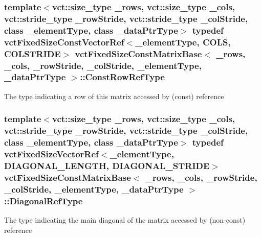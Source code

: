 \subsubsection[{Const\+Row\+Ref\+Type}]{\setlength{\rightskip}{0pt plus 5cm}template$<$vct\+::size\+\_\+type \+\_\+rows, vct\+::size\+\_\+type \+\_\+cols, vct\+::stride\+\_\+type \+\_\+row\+Stride, vct\+::stride\+\_\+type \+\_\+col\+Stride, class \+\_\+element\+Type, class \+\_\+data\+Ptr\+Type$>$ typedef {\bf vct\+Fixed\+Size\+Const\+Vector\+Ref}$<$\+\_\+element\+Type, {\bf C\+O\+L\+S}, {\bf C\+O\+L\+S\+T\+R\+I\+D\+E}$>$ {\bf vct\+Fixed\+Size\+Const\+Matrix\+Base}$<$ \+\_\+rows, \+\_\+cols, \+\_\+row\+Stride, \+\_\+col\+Stride, \+\_\+element\+Type, \+\_\+data\+Ptr\+Type $>$\+::{\bf Const\+Row\+Ref\+Type}}\label{classvct_fixed_size_const_matrix_base_a74355396eec7437755398c2810e0df41}
The type indicating a row of this matrix accessed by (const) reference \hypertarget{classvct_fixed_size_const_matrix_base_ae0b335e845233b49e01f24c1518ee6a1}{}
\subsubsection[{Diagonal\+Ref\+Type}]{\setlength{\rightskip}{0pt plus 5cm}template$<$vct\+::size\+\_\+type \+\_\+rows, vct\+::size\+\_\+type \+\_\+cols, vct\+::stride\+\_\+type \+\_\+row\+Stride, vct\+::stride\+\_\+type \+\_\+col\+Stride, class \+\_\+element\+Type, class \+\_\+data\+Ptr\+Type$>$ typedef {\bf vct\+Fixed\+Size\+Vector\+Ref}$<$\+\_\+element\+Type, {\bf D\+I\+A\+G\+O\+N\+A\+L\+\_\+\+L\+E\+N\+G\+T\+H}, {\bf D\+I\+A\+G\+O\+N\+A\+L\+\_\+\+S\+T\+R\+I\+D\+E}$>$ {\bf vct\+Fixed\+Size\+Const\+Matrix\+Base}$<$ \+\_\+rows, \+\_\+cols, \+\_\+row\+Stride, \+\_\+col\+Stride, \+\_\+element\+Type, \+\_\+data\+Ptr\+Type $>$\+::{\bf Diagonal\+Ref\+Type}}\label{classvct_fixed_size_const_matrix_base_ae0b335e845233b49e01f24c1518ee6a1}
The type indicating the main diagonal of the matrix accessed by (non-\/const) reference \hypertarget{classvct_fixed_size_const_matrix_base_a730b5af5396b0eb074e8465e7db81a5f}{}
